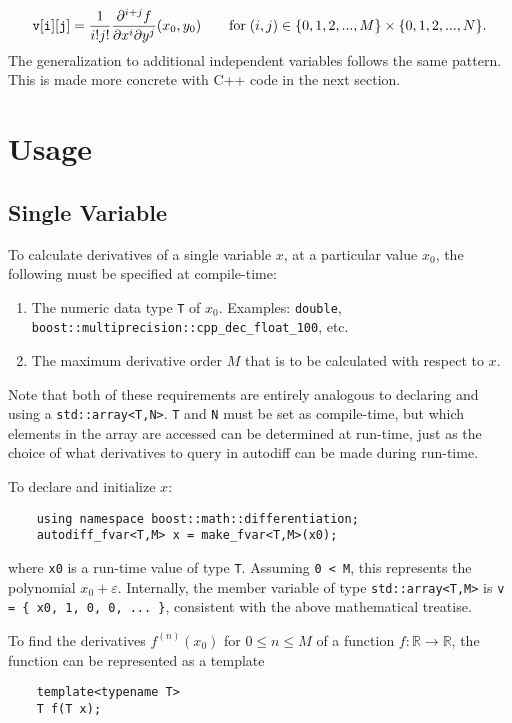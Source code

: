 \documentclass{article}
\begin{document}
\[
{\tt v[i][j]} = \frac{1}{i!j!}\frac{\partial^{i+j}f}{\partial x^i\partial y^j}(x_0,y_0)
    \qquad \text{for}\; (i,j)\in\{0,1,2,...,M\}\times\{0,1,2,...,N\}.
\]
The generalization to additional independent variables follows the same pattern. This is made more concrete with
C++ code in the next section.

\section{Usage}

\subsection{Single Variable}

To calculate derivatives of a single variable $x$, at a particular value $x_0$, the following must be
specified at compile-time:

\begin{enumerate}
\item The numeric data type {\tt T} of $x_0$. Examples: {\tt double},
    {\tt boost::multiprecision::cpp\_dec\_float\_100}, etc.
\item The maximum derivative order $M$ that is to be calculated with respect to $x$.
\end{enumerate}
Note that both of these requirements are entirely analogous to declaring and using a {\tt std::array<T,N>}. {\tt T}
and {\tt N} must be set as compile-time, but which elements in the array are accessed can be determined at run-time,
just as the choice of what derivatives to query in autodiff can be made during run-time.

To declare and initialize $x$:

\begin{verbatim}
    using namespace boost::math::differentiation;
    autodiff_fvar<T,M> x = make_fvar<T,M>(x0);
\end{verbatim}
where {\tt x0} is a run-time value of type {\tt T}. Assuming {\tt 0 < M}, this represents the polynomial $x_0 +
\varepsilon$. Internally, the member variable of type {\tt std::array<T,M>} is {\tt v = \{ x0, 1, 0, 0, ... \}},
consistent with the above mathematical treatise.

To find the derivatives $f^{(n)}(x_0)$ for $0\le n\le M$ of a function
$f : \mathbb{R}\rightarrow\mathbb{R}$, the function can be represented as a template

\begin{verbatim}
    template<typename T>
    T f(T x);
\end{verbatim}
\end{document}
